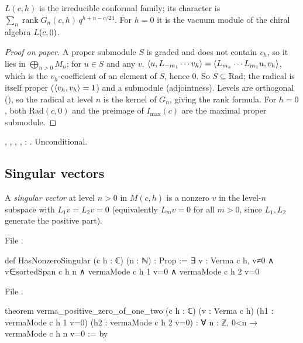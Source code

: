 \begin{physics}
$L(c,h)$ is the irreducible conformal family; its character is $\sum_n\operatorname{rank}G_n(c,h)\,q^{h+n-c/24}$.
For $h = 0$ it is the vacuum module of the chiral algebra $L(c,0)$.
\end{physics}

\begin{proof}[Proof on paper]
A proper submodule $S$ is graded and does not contain $v_h$, so it lies in $\bigoplus_{n>0}M_n$; for
$u\in S$ and any $v$, $\langle u,L_{-m_1}\cdots v_h\rangle = \langle L_{m_k}\cdots L_{m_1}u,v_h\rangle$, which is the
$v_h$-coefficient of an element of $S$, hence $0$. So $S\subseteq\mathrm{Rad}$; the radical is itself
proper ($\langle v_h,v_h\rangle = 1$) and a submodule (adjointness). Levels are orthogonal
(\allowbreak{}), so the radical at level $n$ is the kernel of $G_n$, giving the rank
formula. For $h = 0$, both $\mathrm{Rad}(c,0)$ and the preimage of $I_{\max}(c)$ are the maximal proper
submodule.
\end{proof}

\begin{status}
\allowbreak{}\allowbreak{}\allowbreak{}\allowbreak{}, \allowbreak{}\allowbreak{}\allowbreak{},
, \allowbreak{}, \allowbreak{}:
\lean{[propext, Classical.}\allowbreak{}\allowbreak\lean{sound]}. Unconditional.
\end{status}

\subsection{Singular vectors}

\begin{definition}\label{l06:def:singular}
A \emph{singular vector} at level $n>0$ in $M(c,h)$ is a nonzero $v$ in the level-$n$ subspace with
$L_1v = L_2v = 0$ (equivalently $L_mv = 0$ for all $m>0$, since $L_1,L_2$ generate the positive part).
\end{definition}

File .
\begin{leancode}
def HasNonzeroSingular (c h : ℂ) (n : ℕ) : Prop :=
  ∃ v : Verma c h, v≠0 ∧ v∈sortedSpan c h n ∧
    vermaMode c h 1 v=0 ∧ vermaMode c h 2 v=0
\end{leancode}
File .
\begin{leancode}
theorem verma_positive_zero_of_one_two (c h : ℂ) (v : Verma c h)
    (h1 : vermaMode c h 1 v=0) (h2 : vermaMode c h 2 v=0) :
    ∀ n : ℤ, 0<n → vermaMode c h n v=0 := by
\end{leancode}

